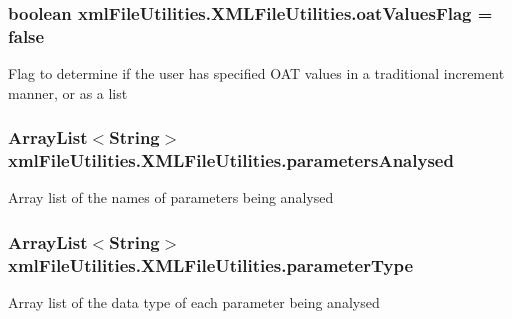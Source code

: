 \subsubsection[{oat\+Values\+Flag}]{\setlength{\rightskip}{0pt plus 5cm}boolean xml\+File\+Utilities.\+X\+M\+L\+File\+Utilities.\+oat\+Values\+Flag = false\hspace{0.3cm}{\ttfamily [static]}}\label{classxmlFileUtilities_1_1XMLFileUtilities_ae10435eb2f2b4c128b4c658edc8fa2e9}
Flag to determine if the user has specified O\+A\+T values in a traditional increment manner, or as a list \hypertarget{classxmlFileUtilities_1_1XMLFileUtilities_aec3cff4dd69b480894a8d3f78d414791}{}
\subsubsection[{parameters\+Analysed}]{\setlength{\rightskip}{0pt plus 5cm}Array\+List$<$String$>$ xml\+File\+Utilities.\+X\+M\+L\+File\+Utilities.\+parameters\+Analysed\hspace{0.3cm}{\ttfamily [static]}}\label{classxmlFileUtilities_1_1XMLFileUtilities_aec3cff4dd69b480894a8d3f78d414791}
Array list of the names of parameters being analysed \hypertarget{classxmlFileUtilities_1_1XMLFileUtilities_a5c6314af241e98f0701b3694e364e27e}{}
\subsubsection[{parameter\+Type}]{\setlength{\rightskip}{0pt plus 5cm}Array\+List$<$String$>$ xml\+File\+Utilities.\+X\+M\+L\+File\+Utilities.\+parameter\+Type\hspace{0.3cm}{\ttfamily [static]}}\label{classxmlFileUtilities_1_1XMLFileUtilities_a5c6314af241e98f0701b3694e364e27e}
Array list of the data type of each parameter being analysed \hypertarget{classxmlFileUtilities_1_1XMLFileUtilities_ac1cd9779fc740585e585498ab598a573}{}

